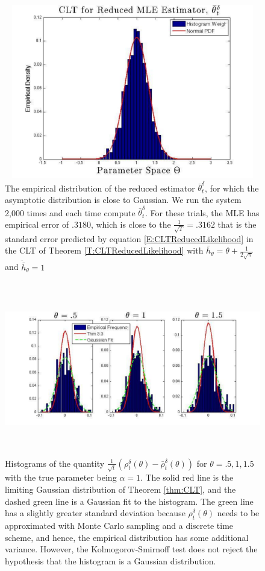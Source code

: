 \documentclass{article}
\begin{document}
\begin{figure}[htbp] %
   \centering
   \includegraphics[height=3in, width=6in]{barThetaHistFit}
  \caption{The empirical distribution of the reduced estimator $\bar\theta_t^\delta$, for which the asymptotic distribution is close to Gaussian. We run the system 2,000 times and each time compute $\bar \theta_t^\delta$. For these trials, the MLE has empirical error of $.3180$, which is close to the $\frac{1}{\sqrt T}=.3162$ that is the standard error predicted by equation \eqref{E:CLTReducedLikelihood} in the CLT of Theorem \ref{T:CLTReducedLikelihood} with $\bar h_{\theta} = \theta+\frac{1}{2\sqrt\pi}$ and $\dot{\bar h}_{\theta} = 1$}
   \label{fig:barThetaHistFit}
\end{figure}


\begin{figure}[htbp] %
   \centering
   \includegraphics[height=3in,width=6.5in]{histFitsCLT}
  \caption{Histograms of the quantity $\frac{1}{\sqrt t}\left(\rho_t^\delta(\theta)-\bar\rho_t^\delta(\theta)\right)$ for $\theta=.5,1,1.5$ with the true parameter being $\alpha=1$. The solid red line is the limiting Gaussian distribution of Theorem \ref{thm:CLT}, and the dashed green line is a Gaussian fit to the histogram. The green line has a slightly greater standard deviation because $\rho_t^\delta(\theta)$ needs to be approximated with Monte Carlo sampling and a discrete time scheme, and hence, the empirical distribution has some additional variance. However, the Kolmogorov-Smirnoff test does not reject the hypothesis that the histogram is a Gaussian distribution.}
   \label{fig:histFitsCLT}
\end{figure}
\end{document}
